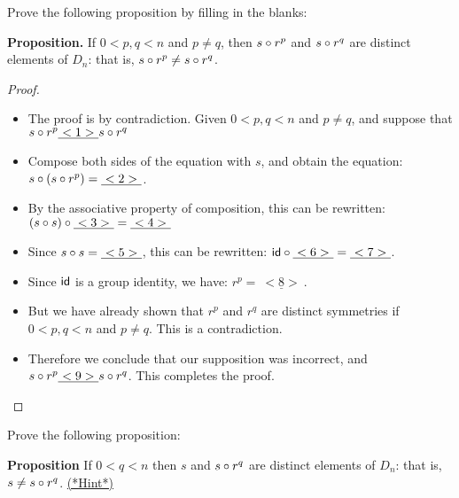 \begin{exercise}{}
Prove the following proposition by filling in the blanks:
\medskip

\noindent \textbf{Proposition.} 
If $0< p,q < n$ and $p \neq q$, then $s \circ r^p$ and $s \circ r^q$ are distinct elements of $D_n$: that is, $s\circ r^p \neq s \circ r^q$.
\medskip

\begin{proof}
\begin{itemize}
\item
 The proof is by contradiction. Given  $0< p,q < n$ and  $p \neq q$, and suppose that $s \circ r^p  \underline{~<1>~} s \circ r^q$
\item
Compose both sides of the equation with $s$, and obtain the equation:  $s \circ (s \circ r^p) =  \underline{~<2>~} $.
\item
By the associative property of composition, this can be rewritten: $(s \circ s) \circ \underline{~<3>~}  =  \underline{~<4>~}$
\item
Since $s \circ s = \underline{~<5>~}$, this can be rewritten: ${\sf{i}d} \circ \underline{~<6>~}  =  \underline{~<7>~}$.
\item
Since ${\sf{i}d}$ is a group identity, we have: $r^p = \underline{~<8>~}$.
\item
But we have already shown that $r^p$ and $r^q$ are distinct symmetries if $0< p,q < n$ and  $p \neq q$. This is a contradiction.
\item
Therefore we conclude that our supposition was incorrect, and $s \circ r^p  \underline{~<9>~} s \circ r^q$. This completes the proof.
\end{itemize}
\end{proof}
\end{exercise}

\begin{exercise}{33}
Prove the following proposition: 
\medskip

\noindent
\textbf{Proposition}
If $0< q < n$  then $s$ and $s \circ r^q$ are distinct elements of $D_n$: that is, $s \neq s \circ r^q$.
\medskip
\hyperref[sec:symmetries:hints]{(*Hint*)}
\end{exercise}

